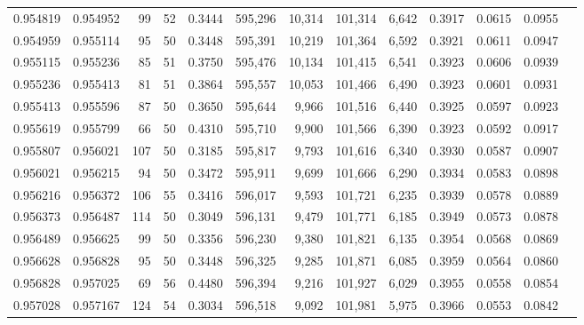 \begin{tabular}{rrrrrrrrrrrrr}
0.954819 & 0.954952 &    99 &  52 &                                     0.3444 & 595,296 &  10,314 & 101,314 &   6,642 & 0.3917 & 0.0615 & 0.0955 \\
0.954959 & 0.955114 &    95 &  50 &                                     0.3448 & 595,391 &  10,219 & 101,364 &   6,592 & 0.3921 & 0.0611 & 0.0947 \\
0.955115 & 0.955236 &    85 &  51 &                                     0.3750 & 595,476 &  10,134 & 101,415 &   6,541 & 0.3923 & 0.0606 & 0.0939 \\
0.955236 & 0.955413 &    81 &  51 &                                     0.3864 & 595,557 &  10,053 & 101,466 &   6,490 & 0.3923 & 0.0601 & 0.0931 \\
0.955413 & 0.955596 &    87 &  50 &                                     0.3650 & 595,644 &   9,966 & 101,516 &   6,440 & 0.3925 & 0.0597 & 0.0923 \\
0.955619 & 0.955799 &    66 &  50 &                                     0.4310 & 595,710 &   9,900 & 101,566 &   6,390 & 0.3923 & 0.0592 & 0.0917 \\
0.955807 & 0.956021 &   107 &  50 &                                     0.3185 & 595,817 &   9,793 & 101,616 &   6,340 & 0.3930 & 0.0587 & 0.0907 \\
0.956021 & 0.956215 &    94 &  50 &                                     0.3472 & 595,911 &   9,699 & 101,666 &   6,290 & 0.3934 & 0.0583 & 0.0898 \\
0.956216 & 0.956372 &   106 &  55 &                                     0.3416 & 596,017 &   9,593 & 101,721 &   6,235 & 0.3939 & 0.0578 & 0.0889 \\
0.956373 & 0.956487 &   114 &  50 &                                     0.3049 & 596,131 &   9,479 & 101,771 &   6,185 & 0.3949 & 0.0573 & 0.0878 \\
0.956489 & 0.956625 &    99 &  50 &                                     0.3356 & 596,230 &   9,380 & 101,821 &   6,135 & 0.3954 & 0.0568 & 0.0869 \\
0.956628 & 0.956828 &    95 &  50 &                                     0.3448 & 596,325 &   9,285 & 101,871 &   6,085 & 0.3959 & 0.0564 & 0.0860 \\
0.956828 & 0.957025 &    69 &  56 &                                     0.4480 & 596,394 &   9,216 & 101,927 &   6,029 & 0.3955 & 0.0558 & 0.0854 \\
0.957028 & 0.957167 &   124 &  54 &                                     0.3034 & 596,518 &   9,092 & 101,981 &   5,975 & 0.3966 & 0.0553 & 0.0842 \\

\end{tabular}
